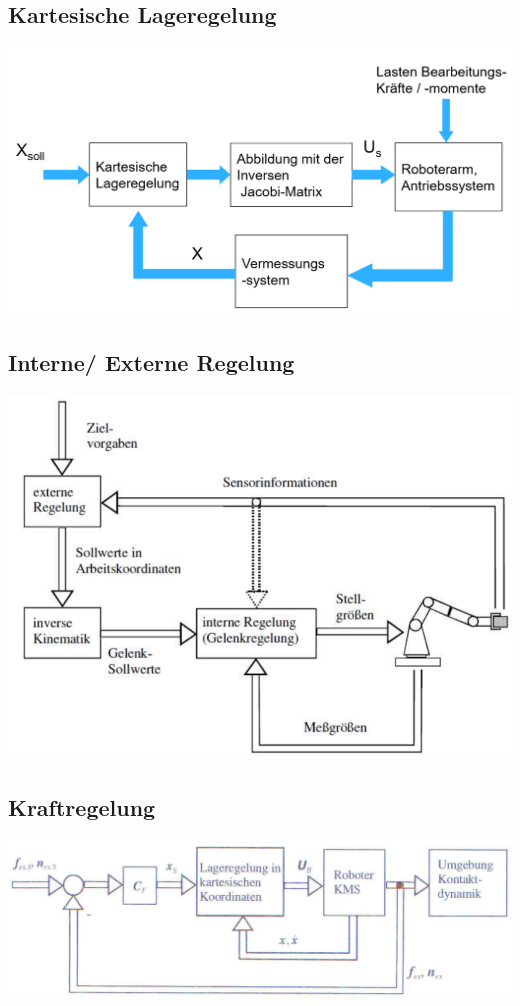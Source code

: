 \begin{minipage}{0.5\linewidth}
    \subsection{Kartesische Lageregelung}
    \includegraphics[width=\linewidth]{./bilder/KartLageRegelung}
\end{minipage}
\begin{minipage}{0.5\linewidth}
    \subsection{Interne/ Externe Regelung}
    \includegraphics[width=0.8\linewidth]{./bilder/InternExternRegelung}
\end{minipage}
\begin{minipage}{0.5\linewidth}
    \subsection{Kraftregelung}
    \includegraphics[width=\linewidth]{./bilder/KraftRegelung}
\end{minipage}
